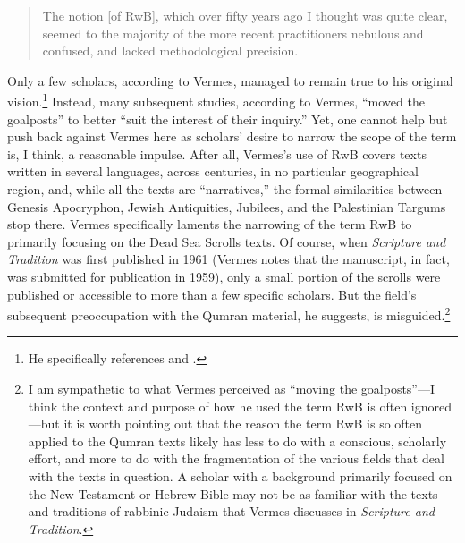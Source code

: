 \begin{quote}
The notion {[}of RwB{]}, which over fifty years ago I thought was quite
clear, seemed to the majority of the more recent practitioners nebulous
and confused, and lacked methodological
precision.\autocite[3]{vermes_zsengeller2014}
\end{quote}

Only a few scholars, according to Vermes, managed to remain true to his
original vision.\footnote{He specifically references
  \textcite{alexander_carson-williamson1988} and
  \textcite{bernstein_textus2005}.} Instead, many subsequent studies,
according to Vermes, ``moved the goalposts'' to better ``suit the
interest of their inquiry.''\autocite[4]{vermes_zsengeller2014} Yet, one
cannot help but push back against Vermes here as scholars' desire to
narrow the scope of the term is, I think, a reasonable impulse. After
all, Vermes's use of RwB covers texts written in several languages,
across centuries, in no particular geographical region, and, while all
the texts are ``narratives,'' the formal similarities between
Genesis Apocryphon, Jewish Antiquities, Jubilees, and the
Palestinian Targums stop there. Vermes specifically laments the
narrowing of the term RwB to primarily focusing on the Dead Sea Scrolls
texts. Of course, when \emph{Scripture and Tradition} was first
published in 1961 (Vermes notes that the manuscript, in fact, was
submitted for publication in 1959), only a small portion of the scrolls
were published or accessible to more than a few specific scholars. But
the field's subsequent preoccupation with the Qumran material, he
suggests, is misguided.\footnote{I am sympathetic to what Vermes
  perceived as ``moving the goalposts''---I think the context and
  purpose of how he used the term RwB is often ignored---but it is worth
  pointing out that the reason the term RwB is so often applied to the
  Qumran texts likely has less to do with a conscious, scholarly effort,
  and more to do with the fragmentation of the various fields that deal
  with the texts in question. A scholar with a background primarily
  focused on the New Testament or Hebrew Bible may not be as familiar
  with the texts and traditions of rabbinic Judaism that Vermes
  discusses in \emph{Scripture and Tradition}.}

